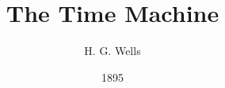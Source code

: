 

\usepackage[hybrid]{markdown}

\usepackage[USenglish]{babel}




\newcommand{\s}[1]{\ifvmode{}\else{\par}\fi—#1}



\title{The Time Machine}
\author{H. G. Wells}
\date{1895}


\usepackage[
    paperwidth=110mm,
    paperheight=178mm,
    top=1.8cm,
    left=1cm,
    right=1cm,
    bottom=2.25cm,
    bindingoffset=5mm
]{geometry}


\usepackage[automark]{scrlayer-scrpage}
\clearpairofpagestyles
\cfoot*{\pagemark}
\renewcommand{\headfont}{\scshape}
\chead{\headmark}
\renewcommand*\chaptermarkformat{\chapterformat : }



\usepackage{relsize}
\renewcommand{\chapterlineswithprefixformat}[3]{%
    {\centering%
        \IfArgIsEmpty{#2}{%
            #3%
        }{
            \ifdef{\liningnums}{%
                \liningnums{#2}%
            }{%
                #2%
            }%
            \relsize{-1.2}{#3}%
        }%
    }%
}


\usepackage[no-math]{fontspec}
\usepackage{ebgaramond}

\parskip=0.5mm

